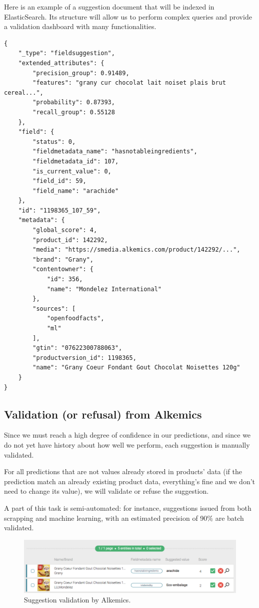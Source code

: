 Here is an example of a suggestion document that will be indexed in ElasticSearch. Its structure will allow us to perform complex queries and provide a validation dashboard with many functionalities.
\begin{verbatim}
{
    "_type": "fieldsuggestion",
    "extended_attributes": {
        "precision_group": 0.91489,
        "features": "grany cur chocolat lait noiset plais brut cereal...",
        "probability": 0.87393,
        "recall_group": 0.55128
    },
    "field": {
        "status": 0,
        "fieldmetadata_name": "hasnotableingredients",
        "fieldmetadata_id": 107,
        "is_current_value": 0,
        "field_id": 59,
        "field_name": "arachide"
    },
    "id": "1198365_107_59",
    "metadata": {
        "global_score": 4,
        "product_id": 142292,
        "media": "https://smedia.alkemics.com/product/142292/...",
        "brand": "Grany",
        "contentowner": {
            "id": 356,
            "name": "Mondelez International"
        },
        "sources": [
            "openfoodfacts",
            "ml"
        ],
        "gtin": "07622300788063",
        "productversion_id": 1198365,
        "name": "Grany Coeur Fondant Gout Chocolat Noisettes 120g"
    }
}
\end{verbatim}


\subsection{Validation (or refusal) from Alkemics}
Since we must reach a high degree of confidence in our predictions, and since we do not yet have history about how well we perform, each suggestion is manually validated. 


For all predictions that are not values already stored in products' data (if the prediction match an already existing product data, everything's fine and we don't need to change its value), we will validate or refuse the suggestion.

A part of this task is semi-automated: for instance, suggestions issued from both scrapping and machine learning, with an estimated precision of 90\% are batch validated.

\begin{figure}[H]
\centering
\includegraphics[scale=0.50]{./images/workflow/validation-suggestion.png}
\caption{Suggestion validation by Alkemics.}
\end{figure}


